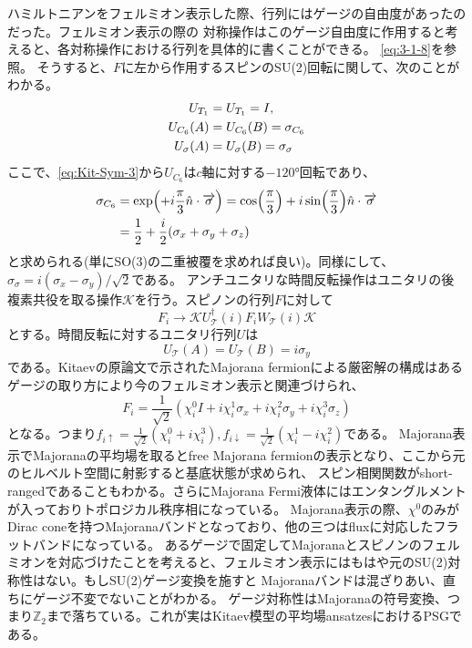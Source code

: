 \documentclass[11pt, aps, longbibliography]{article}
\begin{document}
        ハミルトニアンをフェルミオン表示した際、行列にはゲージの自由度があったのだった。フェルミオン表示の際の
        対称操作はこのゲージ自由度に作用すると考えると、各対称操作における行列を具体的に書くことができる。
        \eqref{eq:3-1-8}を参照。
        そうすると、$F$に左から作用するスピンのSU(2)回転に関して、次のことがわかる。
        \begin{align}\label{eq:Kit-Sym-4}
            U_{T_1} &= U_{T_1} = I, \notag \\
            U_{C_6}(A) &= U_{C_6}(B) = \sigma_{C_6} \\
            U_\sigma(A) &= U_\sigma(B) = \sigma_\sigma \notag 
        \end{align}
        ここで、\eqref{eq:Kit-Sym-3}から$U_{C_6}$は$c$軸に対する$-120$°回転であり、
        \begin{align}\label{eq:Kit-Sym-5}
            \sigma_{C_6} &= \exp(+i\frac{\pi}{3}\hat{n}\cdot \overrightarrow{\sigma}) = \cos(\frac{\pi}{3}) + i\sin(\frac{\pi}{3})\hat{n}\cdot \overrightarrow{\sigma} \notag \\
            &= \frac{1}{2} + \frac{i}{2} (\sigma_x + \sigma_y + \sigma_z)
        \end{align}
        と求められる(単にSO(3)の二重被覆を求めれば良い)。同様にして、
        $\sigma_\sigma = i(\sigma_x - \sigma_y)/\sqrt{2}$である。
        アンチユニタリな時間反転操作はユニタリの後複素共役を取る操作$\mathcal{K}$を行う。スピノンの行列$F$に対して
        \begin{equation}\label{eq:Kit-Sym-6}
            F_i \rightarrow \mathcal{K}U_\mathcal{T}^\dagger(i)F_iW_\mathcal{T}(i)\mathcal{K}
        \end{equation}
        とする。時間反転に対するユニタリ行列$U$は
        \begin{equation}\label{eq:Kit-Sym-7}
            U_\mathcal{T}(A) = U_\mathcal{T}(B) = i\sigma_y
        \end{equation}
        である。Kitaevの原論文で示されたMajorana fermionによる厳密解の構成はあるゲージの取り方により今のフェルミオン表示と関連づけられ、
        \begin{equation}\label{eq:Kit-Sym-8}
            F_i = \frac{1}{\sqrt{2}}(\chi_i^0 I + i \chi_i^1 \sigma_x + i\chi_i^2 \sigma_y + i\chi_i^3 \sigma_z )
        \end{equation}
        となる。つまり$f_{i\uparrow} = \frac{1}{\sqrt{2}}(\chi_i^0 + i\chi_i^3), f_{i\downarrow} = \frac{1}{\sqrt{2}}(\chi_i^1 - i\chi_i^2)$である。
        Majorana表示でMajoranaの平均場を取るとfree Majorana fermionの表示となり、ここから元のヒルベルト空間に射影すると基底状態が求められ、
        スピン相関関数がshort-rangedであることもわかる。さらにMajorana Fermi液体にはエンタングルメントが入っておりトポロジカル秩序相になっている。
        Majorana表示の際、$\chi^0$のみがDirac coneを持つMajoranaバンドとなっており、他の三つはfluxに対応したフラットバンドになっている。
        あるゲージで固定してMajoranaとスピノンのフェルミオンを対応づけたことを考えると、フェルミオン表示にはもはや元のSU(2)対称性はない。もしSU(2)ゲージ変換を施すと
        Majoranaバンドは混ざりあい、直ちにゲージ不変でないことがわかる。
        ゲージ対称性はMajoranaの符号変換、つまり$\mathbb{Z}_2$まで落ちている。これが実はKitaev模型の平均場ansatzesにおけるPSGである。
\end{document}
